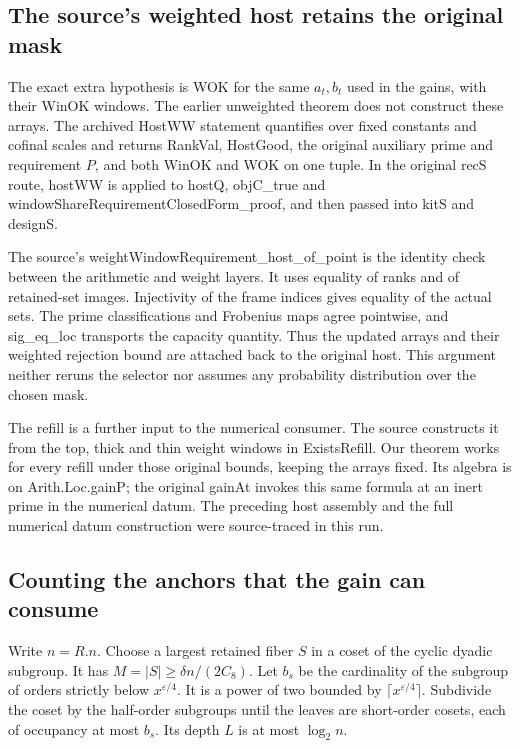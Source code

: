 \documentclass[12pt,letterpaper]{article}
\DeclareRobustCommand{\id}[1]{\mbox{\small\ttfamily #1}}
\begin{document}
\subsection{The source's weighted host retains the original mask}

The exact extra hypothesis is \id{WOK} for the same \(a_t,b_t\) used in the gains, with their \id{WinOK} windows. The earlier unweighted theorem does not construct these arrays. The archived \id{HostWW} statement quantifies over fixed constants and cofinal scales and returns \id{RankVal}, \id{HostGood}, the original auxiliary prime and requirement \(P\), and both \id{WinOK} and \id{WOK} on one tuple. In the original \id{recS} route, \id{hostWW} is applied to \id{hostQ}, \id{objC\_true} and \id{windowShareRequirementClosedForm\_proof}, and then passed into \id{kitS} and \id{designS}.

The source's \id{weightWindowRequirement\_host\_of\_point} is the identity check between the arithmetic and weight layers. It uses equality of ranks and of retained-set images. Injectivity of the frame indices gives equality of the actual sets. The prime classifications and Frobenius maps agree pointwise, and \id{sig\_eq\_loc} transports the capacity quantity. Thus the updated arrays and their weighted rejection bound are attached back to the original host. This argument neither reruns the selector nor assumes any probability distribution over the chosen mask.

The refill is a further input to the numerical consumer. The source constructs it from the top, thick and thin weight windows in \id{ExistsRefill}. Our theorem works for every refill under those original bounds, keeping the arrays fixed. Its algebra is on \id{Arith.Loc.gainP}; the original \id{gainAt} invokes this same formula at an inert prime in the numerical datum. The preceding host assembly and the full numerical datum construction were source-traced in this run.

\subsection{Counting the anchors that the gain can consume}

Write \(n=R.n\). Choose a largest retained fiber \(S\) in a coset of the cyclic dyadic subgroup. It has \(M=|S|\ge\delta n/(2C_8)\). Let \(b_s\) be the cardinality of the subgroup of orders strictly below \(x^{\varepsilon/4}\). It is a power of two bounded by \(\lceil x^{\varepsilon/4}\rceil\). Subdivide the coset by the half-order subgroups until the leaves are short-order cosets, each of occupancy at most \(b_s\). Its depth \(L\) is at most \(\log_2 n\).
\end{document}
